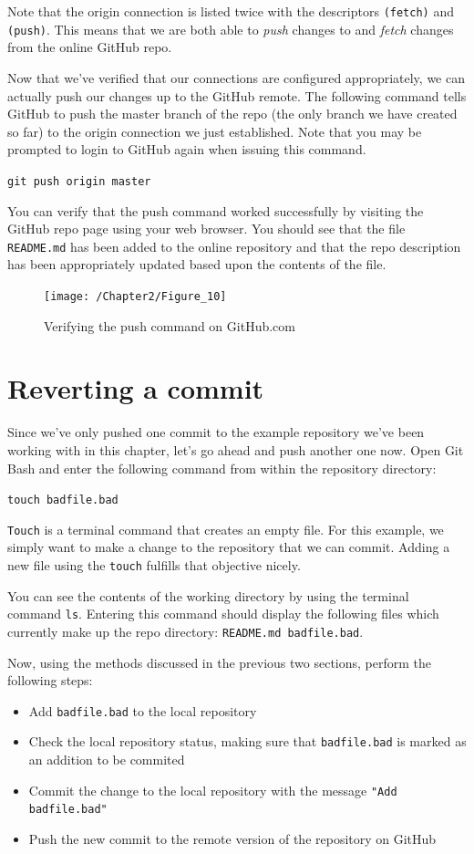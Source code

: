 \documentclass{book}
\begin{document}
Note that the origin connection is listed twice with the descriptors \texttt{(fetch)} and \texttt{(push)}. This means that we are both able to \textit{push} changes to and \textit{fetch} changes from the online GitHub repo.

Now that we've verified that our connections are configured appropriately, we can actually push our changes up to the GitHub remote. The following command tells GitHub to push the master branch of the repo (the only branch we have created so far) to the origin connection we just established. Note that you may be prompted to login to GitHub again when issuing this command.

\texttt{git push origin master}

You can verify that the push command worked successfully by visiting the GitHub repo page using your web browser. You should see that the file \texttt{README.md} has been added to the online repository and that the repo description has been appropriately updated based upon the contents of the file.

\begin{figure}[h]
	\caption{Verifying the push command on GitHub.com}
	\centering\texttt{[image: /Chapter2/Figure\_10]}
\end{figure}

\section{Reverting a commit}
Since we've only pushed one commit to the example repository we've been working with in this chapter, let's go ahead and push another one now. Open Git Bash and enter the following command from within the repository directory:

\texttt{touch badfile.bad}

\texttt{Touch} is a terminal command that creates an empty file. For this example, we simply want to make a change to the repository that we can commit. Adding a new file using the \texttt{touch} fulfills that objective nicely.

You can see the contents of the working directory by using the terminal command \texttt{ls}. Entering this command should display the following files which currently make up the repo directory: \texttt{README.md badfile.bad}.

Now, using the methods discussed in the previous two sections, perform the following steps:

\begin{itemize}
	\item Add \texttt{badfile.bad} to the local repository
	\item Check the local repository status, making sure that \texttt{badfile.bad} is marked as an addition to be commited
	\item Commit the change to the local repository with the message \texttt{"Add badfile.bad"}
	\item Push the new commit to the remote version of the repository on GitHub
\end{itemize}
\end{document}
